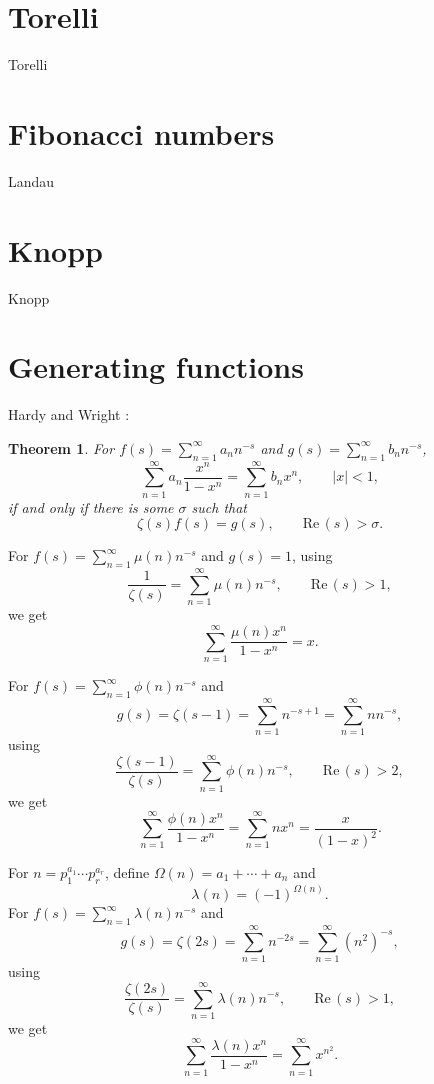 \documentclass{amsart}
\def\Re{\ensuremath{\mathrm{Re}}\,}
\newtheorem{theorem}{Theorem}
\begin{document}
\section{Torelli}
Torelli \cite{torelli}

\section{Fibonacci numbers}
Landau \cite{fibonacci}



\section{Knopp}
Knopp \cite{knopp1913}


\section{Generating functions}
Hardy and Wright \cite[p.~258, Theorem 307]{wright}:

\begin{theorem}
For $f(s)=\sum_{n=1}^\infty a_n n^{-s}$ and $g(s)=\sum_{n=1}^\infty b_n n^{-s}$, 
\[
\sum_{n=1}^\infty a_n \frac{x^n}{1-x^n} = \sum_{n=1}^\infty b_n x^n, \qquad |x|<1,
\]
if and only if there is some $\sigma$ such that
\[
\zeta(s) f(s) = g(s), \qquad \Re(s)>\sigma.
\]
\end{theorem}

For $f(s)=\sum_{n=1}^\infty \mu(n) n^{-s}$ and $g(s)=1$,
using \cite[p.~250, Theorem 287]{wright}
\[
\frac{1}{\zeta(s)} = \sum_{n=1}^\infty \mu(n) n^{-s}, \qquad \Re(s)>1,
\]
we get
\begin{equation}
\sum_{n=1}^\infty  \frac{\mu(n) x^n}{1-x^n} = x.
\label{mobiusgenerating}
\end{equation}

For $f(s) = \sum_{n=1}^\infty \phi(n) n^{-s}$ and 
\[
g(s)=\zeta(s-1)=\sum_{n=1}^\infty n^{-s+1} = \sum_{n=1}^\infty n n^{-s},
\]
using \cite[p.~250, Theorem 288]{wright}
\[
\frac{\zeta(s-1)}{\zeta(s)} = \sum_{n=1}^\infty  \phi(n) n^{-s}, \qquad \Re(s)>2,
\]
we get
\[
\sum_{n=1}^\infty  \frac{\phi(n) x^n}{1-x^n} = \sum_{n=1}^\infty nx^n =
\frac{x}{(1-x)^2}.
\]

For $n=p_1^{a_1} \cdots p_r^{a_r}$, define $\Omega(n) = a_1+\cdots+a_n$ and 
\[
\lambda(n)=(-1)^{\Omega(n)}.
\]
For $f(s)= \sum_{n=1}^\infty \lambda(n) n^{-s}$ and
\[
g(s)=\zeta(2s) = \sum_{n=1}^\infty n^{-2s} = \sum_{n=1}^\infty (n^2)^{-s},
\]
using \cite[p.~255, Theorem 300]{wright}
\[
\frac{\zeta(2s)}{\zeta(s)} = \sum_{n=1}^\infty \lambda(n) n^{-s}, \qquad \Re(s)>1,
\]
we get
\[
\sum_{n=1}^\infty \frac{\lambda(n) x^n}{1-x^n} = \sum_{n=1}^\infty x^{n^2}.
\]
\end{document}
